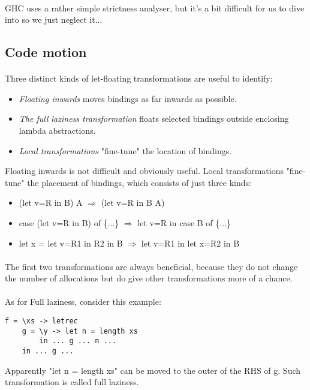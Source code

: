 \documentclass{article}
\begin{document}
	\paragraph{}
	GHC uses a rather simple strictness analyser, but it's a bit difficult for us to dive into so we just neglect it...
	\subsection{Code motion}
	\paragraph{}
	Three distinct kinds of let-floating transformations are useful to identify:
	\begin{itemize}
		\item \emph{Floating inwards} moves bindings as far inwards as possible.
		\item \emph{The full laziness transformation} floats selected bindings outside enclosing lambda abstractions.
		\item \emph{Local transformations} "fine-tune" the location of bindings.
	\end{itemize}
	Floating inwards is not difficult and obviously useful.
	Local transformations "fine-tune" the placement of bindings, which consists of just three kinds:
	\begin{itemize}
		\item (let v=R in B) A $\Rightarrow$ (let v=R in B A)
		\item case (let v=R in B) of \{...\} $\Rightarrow$ let v=R in case B of \{...\}
		\item let x = let v=R1 in R2 in B $\Rightarrow$ let v=R1 in let x=R2 in B
	\end{itemize}
	\paragraph{}
	The first two transformations are always beneficial, because they do not change the number of allocations but do give other transformations more of a chance.
	\paragraph{}
	As for Full laziness, consider this example:
	\begin{lstlisting}
f = \xs -> letrec
	g = \y -> let n = length xs
		in ... g ... n ...
	in ... g ...
	\end{lstlisting}
	Apparently "let n = length xs" can be moved to the outer of the RHS of g. Such transformation is called full laziness.
\end{document}
